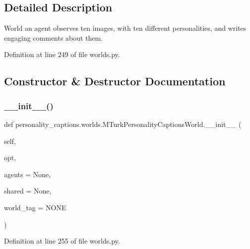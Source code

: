 \subsection{Detailed Description}
\begin{DoxyVerb}World an agent observes ten images, with ten different personalities, and writes
engaging comments about them.
\end{DoxyVerb}
 

Definition at line 249 of file worlds.\+py.



\subsection{Constructor \& Destructor Documentation}
\mbox{\label{classpersonality__captions_1_1worlds_1_1MTurkPersonalityCaptionsWorld_ab05199b7af0da7a70a52e5f563b7511d}} 
\subsubsection{\texorpdfstring{\+\_\+\+\_\+init\+\_\+\+\_\+()}{\_\_init\_\_()}}
{\footnotesize\ttfamily def personality\+\_\+captions.\+worlds.\+M\+Turk\+Personality\+Captions\+World.\+\_\+\+\_\+init\+\_\+\+\_\+ (\begin{DoxyParamCaption}\item[{}]{self,  }\item[{}]{opt,  }\item[{}]{agents = {\ttfamily None},  }\item[{}]{shared = {\ttfamily None},  }\item[{}]{world\+\_\+tag = {\ttfamily \textquotesingle{}NONE\textquotesingle{}} }\end{DoxyParamCaption})}



Definition at line 255 of file worlds.\+py.


